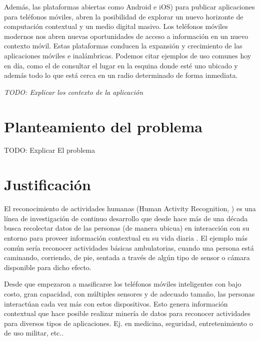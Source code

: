 Además, las plataformas abiertas como Android \cite{google2005and}
e\emph{ }iOS\cite{apple2007ios})
para publicar aplicaciones para teléfonos móviles, abren la posibilidad
de explorar un nuevo horizonte de computación contextual y un medio
digital masivo. Los teléfonos móviles modernos nos abren nuevas oportunidades
de acceso a información en un nuevo contexto móvil\cite{fling2009mobile}.
Estas plataformas conducen la expansión y crecimiento de las aplicaciones
móviles e inalámbricas\cite{Tanenbaum2010}. Podemos citar ejemplos
de uso comunes hoy en día, como el de consultar el lugar en la esquina
donde esté uno ubicado y además todo lo que está cerca en un radio
determinado de forma inmediata. 

\emph{TODO: Explicar los contexto de la aplicación}

\section{Planteamiento del problema\label{planteamiento}}

TODO: Explicar El problema

\section{Justificación\label{justificaciuxf3n}}

El reconocimiento de actividades humanas (Human Activity Recognition,
)
es una línea de investigación de continuo desarrollo que desde hace
más de una década busca recolectar datos de las personas (de manera
ubicua) en interacción con su entorno para proveer información contextual
en su vida diaria \cite{Bao2004}. El ejemplo más común sería reconocer
actividades básicas ambulatorias, cuando una persona está caminando,
corriendo, de pie, sentada a través de algún tipo de sensor o cámara
disponible para dicho efecto.

Desde que empezaron a masificarse los teléfonos móviles inteligentes
con bajo costo, gran capacidad, con múltiples sensores y de adecuado
tamaño, las personas interactúan cada vez más con estos dispositivos.
Esto genera información contextual que hace posible realizar minería
de datos para reconocer actividades para diversos tipos de aplicaciones.
Ej. en medicina, seguridad, entretenimiento o de uso militar, etc.\cite{LaraLabrador2013}.

